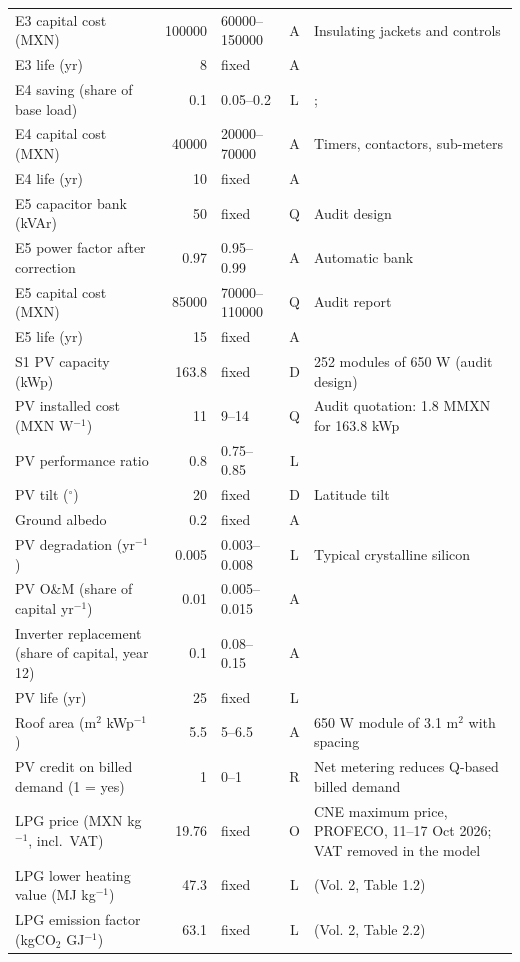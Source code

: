 {\begin{longtable}{p{4.4cm}rlcp{4.0cm}}
E3 capital cost (MXN) & 100000 & 60000--150000 & A & Insulating jackets and controls \\
E3 life (yr) & 8 & fixed & A &  \\
E4 saving (share of base load) & 0.1 & 0.05--0.2 & L & \citet{mouzon2007}; \citet{kara2011} \\
E4 capital cost (MXN) & 40000 & 20000--70000 & A & Timers, contactors, sub-meters \\
E4 life (yr) & 10 & fixed & A &  \\
E5 capacitor bank (kVAr) & 50 & fixed & Q & Audit design \\
E5 power factor after correction & 0.97 & 0.95--0.99 & A & Automatic bank \\
E5 capital cost (MXN) & 85000 & 70000--110000 & Q & Audit report \\
E5 life (yr) & 15 & fixed & A &  \\
S1 PV capacity (kWp) & 163.8 & fixed & D & 252 modules of 650 W (audit design) \\
PV installed cost (MXN W$^{-1}$) & 11 & 9--14 & Q & Audit quotation: 1.8 MMXN for 163.8 kWp \\
PV performance ratio & 0.8 & 0.75--0.85 & L & \citet{reich2012} \\
PV tilt ($^\circ$) & 20 & fixed & D & Latitude tilt \\
Ground albedo & 0.2 & fixed & A &  \\
PV degradation (yr$^{-1}$) & 0.005 & 0.003--0.008 & L & Typical crystalline silicon \\
PV O\&M (share of capital yr$^{-1}$) & 0.01 & 0.005--0.015 & A &  \\
Inverter replacement (share of capital, year 12) & 0.1 & 0.08--0.15 & A &  \\
PV life (yr) & 25 & fixed & L &  \\
Roof area (m$^2$ kWp$^{-1}$) & 5.5 & 5--6.5 & A & 650 W module of 3.1 m$^2$ with spacing \\
PV credit on billed demand (1 = yes) & 1 & 0--1 & R & Net metering reduces Q-based billed demand \\
LPG price (MXN kg$^{-1}$, incl.\ VAT) & 19.76 & fixed & O & CNE maximum price, PROFECO, 11--17 Oct 2026; VAT removed in the model \\
LPG lower heating value (MJ kg$^{-1}$) & 47.3 & fixed & L & \citet{ipcc2006} (Vol. 2, Table 1.2) \\
LPG emission factor (kgCO$_2$ GJ$^{-1}$) & 63.1 & fixed & L & \citet{ipcc2006} (Vol. 2, Table 2.2) \\

\end{longtable}}
